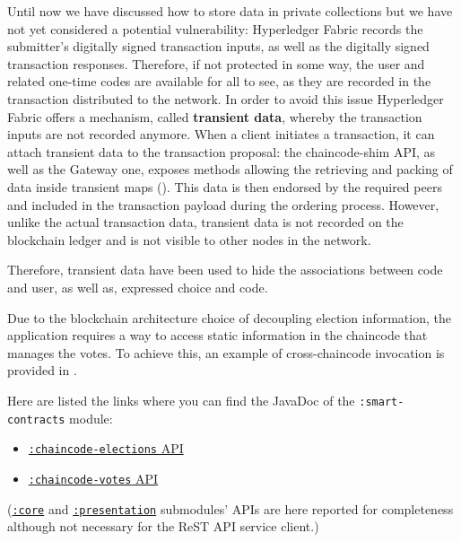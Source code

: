 \documentclass{scrartcl}
\begin{document}

Until now we have discussed how to store data in private collections but we have not yet considered a potential vulnerability: Hyperledger Fabric records the submitter's digitally signed transaction inputs, as well as the digitally signed transaction responses.
%
Therefore, if not protected in some way, the user and related one-time codes are available for all to see, as they are recorded in the transaction distributed to the network.
%
In order to avoid this issue Hyperledger Fabric offers a mechanism, called \textbf{transient data}, whereby the transaction inputs are not recorded anymore.
%
When a client initiates a transaction, it can attach transient data to the transaction proposal: the chaincode-shim API, as well as the Gateway one, exposes methods allowing the retrieving and packing of data inside transient maps ().
%
This data is then endorsed by the required peers and included in the transaction payload during the ordering process. 
%
However, unlike the actual transaction data, transient data is not recorded on the blockchain ledger and is not visible to other nodes in the network.

Therefore, transient data have been used to hide the associations between code and user, as well as, expressed choice and code. 

Due to the blockchain architecture choice of decoupling election information, the application requires a way to access static information in the chaincode that manages the votes. To achieve this, an example of cross-chaincode invocation is provided in .


\begin{info}
    Here are listed the links where you can find the JavaDoc of the \texttt{:smart-contracts} module:
    \begin{itemize}
        \item \href{https://tassiluca.github.io/ChainVote/smart-contracts/javadoc/chaincode-elections/}{\texttt{:chaincode-elections} API}
        \item \href{https://tassiluca.github.io/ChainVote/smart-contracts/javadoc/chaincode-votes/}{\texttt{:chaincode-votes} API}
    \end{itemize}
    (\href{https://tassiluca.github.io/ChainVote/smart-contracts/javadoc/core/}{\texttt{:core}} and \href{https://tassiluca.github.io/ChainVote/smart-contracts/javadoc/presentation/}{\texttt{:presentation}} submodules' APIs are here reported for completeness although not necessary for the ReST API service client.)
\end{info}
\end{document}
